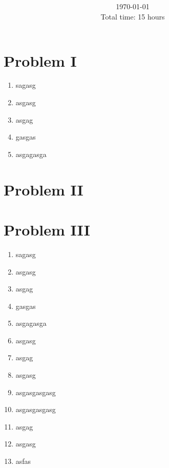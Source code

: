 \documentclass[letterpaper,11pt,twoside]{article}
\title{\textbf{\assignment}\\\course\\{\Large\institution}}
\author{\autor}
\date{\today\\Total time: 15 hours}
\begin{document}
\pagestyle{mainstyle}
\maketitle
\section*{Problem I}
\begin{enumerate}[itemsep=0pt,topsep=0pt,label=\alph*)]
  \item sagasg
  \item asgasg
  \item asgag
  \item gasgas
  \item asgagasga
\end{enumerate}
\section*{Problem II}

\section*{Problem III}
\begin{enumerate}[itemsep=0pt,topsep=0pt,label=\alph*)]
  \item sagasg
  \item asgasg
  \item asgag
  \item gasgas
  \item asgagasga
  \item asgasg
  \item asgag
  \item asgasg
  \item asgasgasgasg
  \item asgasgasgasg
  \item asgag
  \item asgasg
  \item asfas
\end{enumerate}

\end{document}
